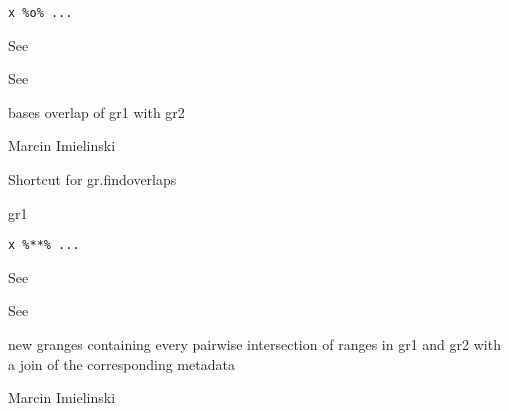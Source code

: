 \documentclass[a4paper]{book}
\begin{document}
%
\begin{Usage}
\begin{verbatim}
x %o% ...
\end{verbatim}
\end{Usage}
%
\begin{Arguments}
\begin{ldescription}
\item[\code{x}] See 

\item[\code{...}] See 
\end{ldescription}
\end{Arguments}
%
\begin{Value}
bases overlap of gr1 with gr2
\end{Value}
%
\begin{Author}\relax
Marcin Imielinski
\end{Author}
%
\begin{Description}\relax
Shortcut for gr.findoverlaps

gr1 
\end{Description}
%
\begin{Usage}
\begin{verbatim}
x %**% ...
\end{verbatim}
\end{Usage}
%
\begin{Arguments}
\begin{ldescription}
\item[\code{x}] See 

\item[\code{...}] See 
\end{ldescription}
\end{Arguments}
%
\begin{Value}
new granges containing every pairwise intersection of ranges in gr1 and gr2 with a join of the corresponding metadata
\end{Value}
%
\begin{Author}\relax
Marcin Imielinski
\end{Author}
\end{document}
